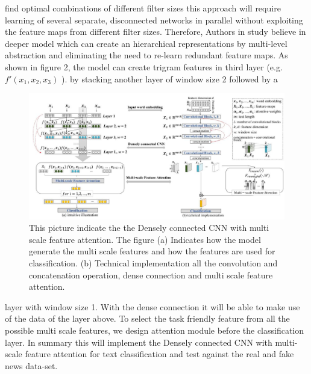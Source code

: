 \documentclass{MX2020}
\begin{document}
find optimal combinations of different filter sizes this approach will require learning of several separate, disconnected networks in parallel without exploiting the feature maps from different filter sizes. Therefore, Authors in study \cite{Shiyao} believe in deeper model which can create an hierarchical representations by multi-level abstraction and eliminating the need to re-learn redundant feature maps. As shown in figure 2, the model can create trigram features in third layer (e.g.\(f'(x_1, x_2, x_3)\) ).
by stacking another layer of window size 2 followed by a 

\begin{figure}
    \centering
        \includegraphics[width=1\textwidth]{model.png}
        \caption{{This picture indicate the the Densely connected CNN with multi scale feature attention. The figure (a) Indicates how the model generate the multi scale features and how the features are used for classification. (b) Technical implementation all the convolution and concatenation operation, dense connection and multi scale feature attention.}}
        \label{fig:model}
\end{figure}

layer with window size 1. With the dense connection it will be able to make use of the data of the layer above. To select the task friendly feature from all the possible multi scale features, we design attention module before the classification layer. In summary this will implement the Densely connected CNN with multi-scale feature attention for text classification\cite{Shiyao} and test against the real and fake news data-set.
\end{document}
